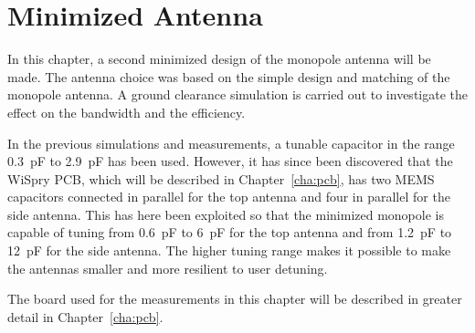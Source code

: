\chapter{Minimized Antenna}
\label{cha_intro_5mm}
In this chapter, a second minimized design of the monopole antenna will be made.
The antenna choice was based on the simple design and matching of the monopole antenna.
A ground clearance simulation is carried out to investigate the effect on the bandwidth and the efficiency.

In the previous simulations and measurements, a tunable capacitor in the range \SI{0.3}{pF} to \SI{2.9}{pF} has been used. However, it has since been discovered that the WiSpry PCB, which will be described in Chapter~\ref{cha:pcb}, has two MEMS capacitors connected in parallel for the top antenna and four in parallel for the side antenna. This has here been exploited so that the minimized monopole is capable of tuning from \SI{0.6}{pF} to \SI{6}{pF} for the top antenna and from \SI{1.2}{pF} to \SI{12}{pF} for the side antenna. The higher tuning range makes it possible to make the antennas smaller and more resilient to user detuning.

The board used for the measurements in this chapter will be described in greater detail in Chapter~\ref{cha:pcb}.
